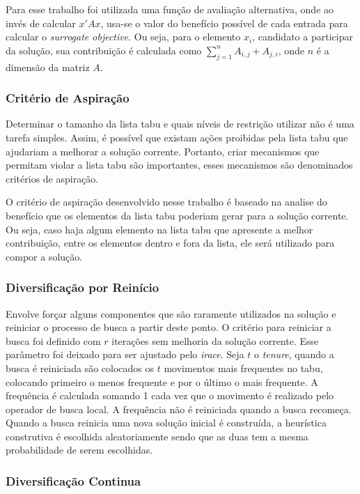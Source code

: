 \documentclass[12pt,a4paper]{article}
\begin{document}
        Para esse trabalho foi utilizada uma função de avaliação alternativa, onde ao invés de calcular $x'Ax$, usa-se o valor do benefício possível de cada entrada para calcular o {\it surrogate
        objective}. Ou seja, para o elemento $x_i$, candidato a participar da solução, sua contribuição é calculada como $\sum_{j=1}^n A_{i,j}+A_{j,i}$, onde $n$ é a dimensão da matriz $A$.

    \subsubsection{Critério de Aspiração} 

        Determinar o tamanho da lista tabu e quais níveis de restrição utilizar não é uma tarefa simples. Assim, é possível que existam ações proibidas pela lista tabu que ajudariam a
        melhorar a solução corrente. Portanto, criar mecanismos que permitam violar a lista tabu são importantes, esses mecanismos são denominados critérios de aspiração. 

        O critério de aspiração desenvolvido nesse trabalho é baseado na analise do benefício que os elementos da lista tabu poderiam gerar para a solução corrente. Ou seja, caso haja algum elemento
        na lista tabu que apresente a melhor contribuição, entre os elementos dentro e fora da lista, ele será utilizado para compor a solução.

    \subsubsection{Diversificação por Reinício}

        Envolve forçar alguns componentes que são raramente utilizados na solução e reiniciar o processo de busca a partir deste ponto. O critério para reiniciar a busca foi definido com $r$
        iterações sem melhoria da solução corrente. Esse parâmetro foi deixado para ser ajustado pelo \textit{irace}. Seja $t$ o \textit{tenure}, quando a busca é reiniciada são colocados os $t$
        movimentos mais frequentes no tabu, colocando primeiro o menos frequente e por o último o mais frequente. A frequência é calculada somando 1 cada vez que o movimento é realizado pelo
        operador de busca local. A frequência não é reiniciada quando a busca recomeça. Quando a busca reinicia uma nova solução inicial é construída, a heurística construtiva é escolhida
        aleatoriamente sendo que as duas tem a mesma probabilidade de serem escolhidas. 

    \subsubsection{Diversificação Continua}
\end{document}
